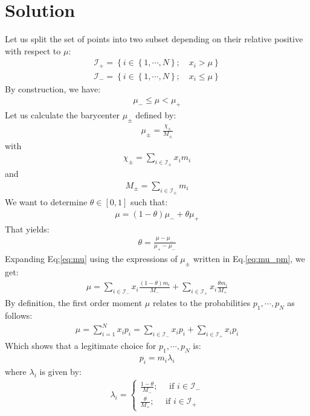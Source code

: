 \documentclass[10pt,a4paper]{article}
\begin{document}
\section{Solution}
Let us split the set of points into two subset depending on their relative positive with respect to $\mu$:
\begin{align}
\mathcal{I}_+ = \left\lbrace i \in \left\lbrace 1, \cdots, N \right\rbrace ; \quad x_i > \mu \right\rbrace\\
\mathcal{I}_- = \left\lbrace i \in \left\lbrace 1, \cdots, N \right\rbrace ; \quad x_i \leq \mu \right\rbrace
\end{align}
By construction, we have:
\begin{align}
\mu_- \leq \mu < \mu_+
\end{align}
Let us calculate the barycenter $\mu_\pm$ defined by:
\begin{align}\label{eq:mu_pm}
\mu_\pm = \frac{\chi_\pm}{M_\pm}
\end{align}
with
\begin{align}
\chi_\pm = \sum_{i \in \mathcal{I}_\pm} x_i m_i
\end{align}
and
\begin{align}
M_\pm = \sum_{i \in \mathcal{I}_\pm} m_i
\end{align}
We want to determine $\theta \in \left[0, 1 \right]$ such that:
\begin{align}\label{eq:mu}
\mu = (1-\theta) \mu_- + \theta \mu_+ 
\end{align}
That yields:
\begin{align}
\theta = \frac{\mu - \mu_-}{\mu_+ - \mu_-}
\end{align}
Expanding Eq;\ref{eq:mu} using the expressions of $\mu_\pm$ written in Eq.\ref{eq:mu_pm}, we get:
\begin{align}
\mu = \sum_{i \in \mathcal{I}_-} x_i\frac{(1-\theta) m_i}{M_-} + \sum_{i \in \mathcal{I}_+} x_i\frac{\theta m_i}{M_+}
\end{align}
By definition, the first order moment $\mu$ relates to the probabilities $p_1, \cdots, p_N$ as follows:
\begin{align}
\mu = \sum_{i = 1}^N x_i p_i = \sum_{i \in \mathcal{I}_-} x_i p_i + \sum_{i \in \mathcal{I}_+} x_i p_i 
\end{align}
Which shows that a legitimate choice for $p_1, \cdots, p_N$ is:
\begin{align}
p_i = m_i \lambda_i
\end{align}
where $\lambda_i$ is given by:
\begin{align}
\lambda_i = 
\begin{cases}
\frac{1-\theta}{M_-} ; \quad \text{ if } i \in \mathcal{I}_-\\
\frac{\theta}{M_+} ; \quad \text{ if } i \in \mathcal{I}_+
\end{cases}
\end{align}
\end{document}
